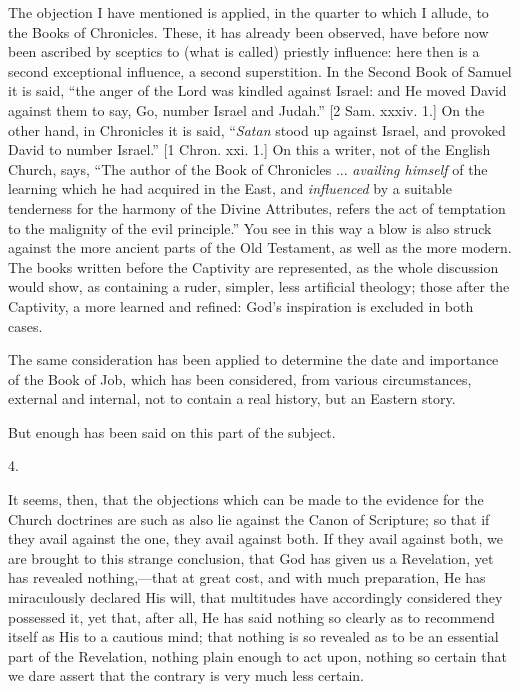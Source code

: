The objection I have mentioned is applied, in the quarter to which
I allude, to the Books of Chronicles. These, it has already been
observed, have before now been ascribed by sceptics to (what is
called) priestly influence: here then is a second exceptional
influence, a second superstition. In the Second Book of Samuel
it is said, ``the anger of the Lord was kindled against Israel:
and He moved David against them to say, Go, number Israel and
Judah.'' [2 Sam. xxxiv. 1.] On the other hand, in Chronicles it is
said, ``\emph{Satan} stood up against Israel, and provoked David
to number Israel.'' [1 Chron. xxi. 1.] On this a writer, not of
the English Church, says, ``The author of the Book of Chronicles
... \emph{availing himself} of the learning which he had acquired in
the East, and \emph{influenced} by a suitable tenderness for the
harmony of the Divine Attributes, refers the act of temptation to the
malignity of the evil principle.'' You see in this way a blow is
also struck against the more ancient parts of the Old Testament, as
well as the more modern. The books written before the Captivity are
represented, as the whole discussion would show, as containing a
ruder, simpler, less artificial theology; those after the Captivity, a
more learned and refined: God's inspiration is excluded in both cases.

The same consideration has been applied to determine the date and
importance of the Book of Job, which has been considered, from various
circumstances, external and internal, not to contain a real history,
but an Eastern story.

But enough has been said on this part of the subject.

4.

It seems, then, that the objections which can be made to the
evidence for the Church doctrines are such as also lie against the
Canon of Scripture; so that if they avail against the one, they avail
against both. If they avail against both, we are brought to this
strange conclusion, that God has given us a Revelation, yet has
revealed nothing,—that at great cost, and with much
preparation, He has miraculously declared His will, that multitudes
have accordingly considered they possessed it, yet that, after all, He
has said nothing so clearly as to recommend itself as His to a
cautious mind; that nothing is so revealed as to be an essential part
of the Revelation, nothing plain enough to act upon, nothing so
certain that we dare assert that the contrary is very much less
certain.

